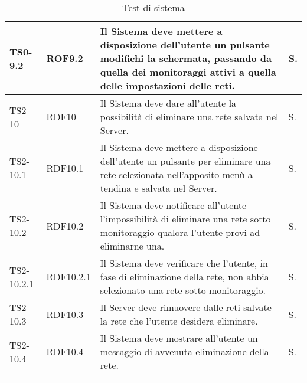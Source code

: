 \begin{longtable}{|C{.15\textwidth}|C{.14\textwidth}|m{.52\textwidth}|m{.08\textwidth}|}
\hline
{}TS0-9.2 & ROF9.2 & Il Sistema deve mettere a disposizione dell'utente un pulsante modifichi la schermata, passando da quella dei monitoraggi attivi a quella delle impostazioni delle reti. & S. \\
\hline
TS2-10 & RDF10 & Il Sistema deve dare all'utente la possibilità di eliminare una rete salvata nel Server. & S. \\
\hline
{}TS2-10.1 & RDF10.1 & Il Sistema deve mettere a disposizione dell'utente un pulsante per eliminare una rete selezionata nell'apposito menù a tendina e salvata nel Server. & S. \\
\hline
TS2-10.2 & RDF10.2 & Il Sistema deve notificare all'utente l'impossibilità di eliminare una rete sotto monitoraggio qualora l'utente provi ad eliminarne una. & S. \\
\hline
{}TS2-10.2.1 & RDF10.2.1 & Il Sistema deve verificare che l'utente, in fase di eliminazione della rete, non abbia selezionato una rete sotto monitoraggio. & S. \\
\hline
TS2-10.3 & RDF10.3 & Il Server deve rimuovere dalle reti salvate la rete che l'utente desidera eliminare. & S. \\
\hline

TS2-10.4 & RDF10.4 & Il Sistema deve mostrare all'utente un messaggio di avvenuta eliminazione della rete. & S. \\
\hline

\caption{Test di sistema}
\label{testdisistema}
\end{longtable}